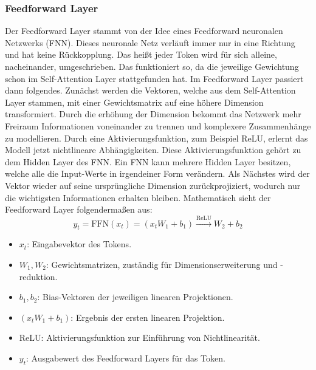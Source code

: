 \subsubsection{Feedforward Layer}
Der Feedforward Layer stammt von der Idee eines Feedforward neuronalen Netzwerks (FNN).
Dieses neuronale Netz verläuft immer nur in eine Richtung und hat keine Rückkopplung.
Das heißt jeder Token wird für sich alleine, nacheinander, umgeschrieben.
Das funktioniert so, da die jeweilige Gewichtung schon im Self-Attention Layer stattgefunden hat.
Im Feedforward Layer passiert dann folgendes.
Zunächst werden die Vektoren, welche aus dem Self-Attention Layer stammen,
mit einer Gewichtsmatrix auf eine höhere Dimension transformiert.
Durch die erhöhung der Dimension bekommt das Netzwerk mehr Freiraum Informationen voneinander zu trennen
und komplexere Zusammenhänge zu modellieren.
Durch eine Aktivierungsfunktion, zum Beispiel ReLU, erlernt das Modell jetzt nichtlineare Abhängigkeiten.
Diese Aktivierungsfunktion gehört zu dem Hidden Layer des FNN.
Ein FNN kann mehrere Hidden Layer besitzen, welche alle die Input-Werte in irgendeiner Form verändern.
Als Nächstes wird der Vektor wieder auf seine ursprüngliche Dimension zurückprojiziert,
wodurch nur die wichtigsten Informationen erhalten bleiben.
Mathematisch sieht der Feedforward Layer folgendermaßen aus:
\[
y_t = \text{FFN}(x_t) = \left( x_t W_1 + b_1 \right) \xrightarrow{\text{ReLU}} W_2 + b_2
\]
\begin{itemize}
  \item $x_t$: Eingabevektor des Tokens.
  \item $W_1, W_2$: Gewichtsmatrizen, zuständig für Dimensionserweiterung und -reduktion.
  \item $b_1, b_2$: Bias-Vektoren der jeweiligen linearen Projektionen.
  \item $\left( x_t W_1 + b_1 \right)$: Ergebnis der ersten linearen Projektion.
  \item $\text{ReLU}$: Aktivierungsfunktion zur Einführung von Nichtlinearität.
  \item $y_t$: Ausgabewert des Feedforward Layers für das Token.
\end{itemize}

